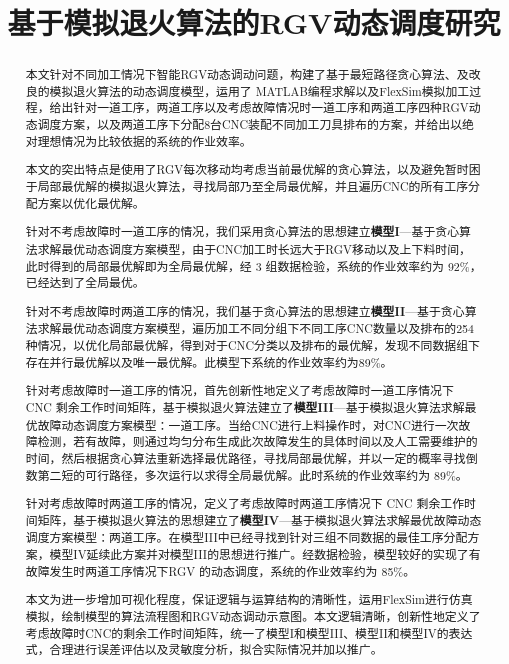 \documentclass[no-math,withoutpreface,bwprint]{cumcmthesis} %
\title{基于模拟退火算法的RGV动态调度研究 }
\numberwithin{equation}{section}
\numberwithin{figure}{section}
\numberwithin{table}{section}
\begin{document}
 \maketitle
 \begin{abstract}
本文针对不同加工情况下智能RGV动态调动问题，构建了基于最短路径贪心算法、及改良的模拟退火算法的动态调度模型，运用了 MATLAB编程求解以及FlexSim模拟加工过程，给出针对一道工序，两道工序以及考虑故障情况时一道工序和两道工序四种RGV动态调度方案，以及两道工序下分配8台CNC装配不同加工刀具排布的方案，并给出以绝对理想情况为比较依据的系统的作业效率。

本文的突出特点是使用了RGV每次移动均考虑当前最优解的贪心算法，以及避免暂时困于局部最优解的模拟退火算法，寻找局部乃至全局最优解，并且遍历CNC的所有工序分配方案以优化最优解。 

针对不考虑故障时一道工序的情况，我们采用贪心算法的思想建立{\bfseries\song 模型I}—基于贪心算法求解最优动态调度方案模型，由于CNC加工时长远大于RGV移动以及上下料时间，此时得到的局部最优解即为全局最优解，经 3 组数据检验，系统的作业效率约为 92\%，已经达到了全局最优。

针对不考虑故障时两道工序的情况，我们基于贪心算法的思想建立{\bfseries\song 模型II}—基于贪心算法求解最优动态调度方案模型，遍历加工不同分组下不同工序CNC数量以及排布的254种情况，以优化局部最优解，得到对于CNC分类以及排布的最优解，发现不同数据组下存在并行最优解以及唯一最优解。此模型下系统的作业效率约为89\%。

针对考虑故障时一道工序的情况，首先创新性地定义了考虑故障时一道工序情况下 CNC 剩余工作时间矩阵，基于模拟退火算法建立了{\bfseries\song 模型III}—基于模拟退火算法求解最优故障动态调度方案模型：一道工序。当给CNC进行上料操作时，对CNC进行一次故障检测，若有故障，则通过均匀分布生成此次故障发生的具体时间以及人工需要维护的时间，然后根据贪心算法重新选择最优路径，寻找局部最优解，并以一定的概率寻找倒数第二短的可行路径，多次运行以求得全局最优解。此时系统的作业效率约为 89\%。

针对考虑故障时两道工序的情况，定义了考虑故障时两道工序情况下 CNC 剩余工作时间矩阵，基于模拟退火算法的思想建立了{\bfseries\song 模型IV}—基于模拟退火算法求解最优故障动态调度方案模型：两道工序。在模型III中已经寻找到针对三组不同数据的最佳工序分配方案，模型IV延续此方案并对模型III的思想进行推广。经数据检验，模型较好的实现了有故障发生时两道工序情况下RGV 的动态调度，系统的作业效率约为 85\%。

本文为进一步增加可视化程度，保证逻辑与运算结构的清晰性，运用FlexSim进行仿真模拟，绘制模型的算法流程图和RGV动态调动示意图。本文逻辑清晰，创新性地定义了考虑故障时CNC的剩余工作时间矩阵，统一了模型I和模型III、模型II和模型IV的表达式，合理进行误差评估以及灵敏度分析，拟合实际情况并加以推广。 

\end{abstract}
\end{document}

